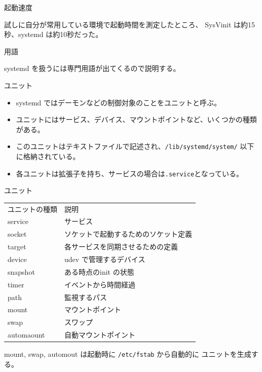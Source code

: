 \begin{frame}[containsverbatim]{起動速度}

試しに自分が常用している環境で起動時間を測定したところ、
SysVinit は約15秒、systemd は約10秒だった。 

\end{frame}

\begin{frame}{用語}

systemd を扱うには専門用語が出てくるので説明する。

\end{frame}

\begin{frame}{ユニット}

\begin{itemize}
\item systemd ではデーモンなどの制御対象のことをユニットと呼ぶ。
\item ユニットにはサービス、デバイス、マウントポイントなど、いくつかの種類がある。
\item このユニットはテキストファイルで記述され、\texttt{/lib/systemd/system/} 以下に格納されている。
\item 各ユニットは拡張子を持ち、サービスの場合は\texttt{.service}となっている。
\end{itemize}

\end{frame}

\begin{frame}{ユニット}

\begin{table}[htb]
\begin{center}
  \begin{tabular}{ll}
    ユニットの種類 & 説明 \\
    service & サービス \\
    socket & ソケットで起動するためのソケット定義 \\
    target & 各サービスを同期させるための定義 \\
    device & udev で管理するデバイス \\
    snapshot & ある時点のinit の状態 \\
    timer & イベントから時間経過 \\
    path & 監視するパス \\
    mount & マウントポイント \\
    swap & スワップ \\
    automaount & 自動マウントポイント \\
  \end{tabular}
\end{center}
\end{table}

mount, swap, automout は起動時に \texttt{/etc/fstab} から自動的に
ユニットを生成する。

\end{frame}

